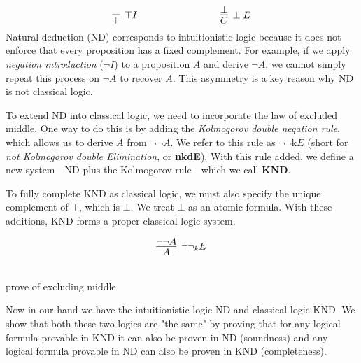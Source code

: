 \documentclass{article}
\begin{document}
\[
\infer[\top I]{\top}{}
\hspace{3cm}
\infer[\perp E]{C}{\perp}
\]
Natural deduction (ND) corresponds to intuitionistic logic because it does not enforce that every proposition has a fixed complement. For example, if we apply \emph{negation introduction} ($\neg I$) to a proposition $A$ and derive $\neg A$, we cannot simply repeat this process on $\neg A$ to recover $A$. This asymmetry is a key reason why ND is not classical logic.

To extend ND into classical logic, we need to incorporate the law of excluded middle. One way to do this is by adding the \emph{Kolmogorov double negation rule}, which allows us to derive $A$ from $\neg\neg A$. We refer to this rule as $\neg\neg\text{k}E$ (short for \emph{not Kolmogorov double Elimination}, or \textbf{nkdE}). With this rule added, we define a new system—ND plus the Kolmogorov rule—which we call \textbf{KND}.

To fully complete KND as classical logic, we must also specify the unique complement of $\top$, which is $\bot$. We treat $\bot$ as an atomic formula. With these additions, KND forms a proper classical logic system.

\[
\infer[\neg\neg_{k}E]{A}{\neg\neg A}
\]

\begin{center}
\\
\vspace{1em}
prove of excluding middle

\end{center}





Now in our hand we have the intuitionistic logic ND
 and classical logic KND. We show that both these two
  logics are "the same" by proving that for any logical formula provable in KND it can also be proven in ND (soundness) and any logical formula provable in ND can also be proven in KND (completeness).
\end{document}
